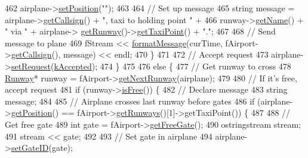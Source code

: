 \begin{DoxyCode}
462             airplane->\hyperlink{classAirplane_a656e916c30af73584f781e7e2e28e78a}{setPosition}(\textcolor{stringliteral}{""});
463 
464             \textcolor{comment}{// Set up message}
465             \textcolor{keywordtype}{string} message = airplane->\hyperlink{classAirplane_a6a62bd06d28789336c5ce1543d9391f1}{getCallsign}() + \textcolor{stringliteral}{", taxi to holding point "} +
466                              runway->\hyperlink{classRunway_a2934c38f3af6080f7b40c306a27c57cd}{getName}() + \textcolor{stringliteral}{" via "} + airplane->
      \hyperlink{classAirplane_ab6dda72f7cfd29a7334e0494d184bbfa}{getRunway}()->\hyperlink{classRunway_ad2d8fd5696ec93e2fa3d32bec3d02f59}{getTaxiPoint}() + \textcolor{stringliteral}{"."};
467 
468             \textcolor{comment}{// Send message to plane}
469             fStream << \hyperlink{classATC_a2fca67fc154c7d8a6c14198697653059}{formatMessage}(curTime, fAirport->\hyperlink{classAirport_a6ed56e05a8c881b8e4718a34ba9cccc5}{getCallsign}(), message) << 
      endl;
470         \}
471 
472         \textcolor{comment}{// Accept request}
473         airplane->\hyperlink{classAirplane_affcc5325670824881ccc1524223aa209}{setRequest}(\hyperlink{Airplane_8h_a4a8a3f45932bdf601f093bea061bad9ba15597ea7f444a937d40b39b9ea99dd1d}{kAccepted});
474     \}
475 
476     \textcolor{keywordflow}{else} \{
477         \textcolor{comment}{// Get runway to cross}
478         \hyperlink{classRunway}{Runway}* runway = fAirport->\hyperlink{classAirport_a894669e2c8865a6c0442004e7e75063c}{getNextRunway}(airplane);
479 
480         \textcolor{comment}{// If it's free, accept request}
481         \textcolor{keywordflow}{if} (runway->\hyperlink{classRunway_a7696b8546ad5ba33d401d7ba740c5936}{isFree}()) \{
482             \textcolor{comment}{// Declare message}
483             \textcolor{keywordtype}{string} message;
484 
485             \textcolor{comment}{// Airplane crosses last runway before gates}
486             \textcolor{keywordflow}{if} (airplane->\hyperlink{classAirplane_ab4fa66c0adb05725a51524265f8c520c}{getPosition}() == fAirport->\hyperlink{classAirport_a14310ffeba8a024105071c156fd42cf7}{getRunways}()[1]->getTaxiPoint()) 
      \{
487 
488                 \textcolor{comment}{// Get free gate}
489                 \textcolor{keywordtype}{int} gate = fAirport->\hyperlink{classAirport_a73b57b192084fb8082d912da70beb5b0}{getFreeGate}();
490                 ostringstream stream;
491                 stream << gate;
492 
493                 \textcolor{comment}{// Set gate in airplane}
494                 airplane->\hyperlink{classAirplane_aed585c73c9dd5065bd1f8b55236260a0}{setGateID}(gate);

\end{DoxyCode}
